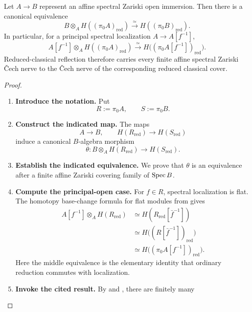 \begin{lemma}
\label{lem:reduced-zariski-base-change}
Let \(A\to B\) represent an affine spectral Zariski open immersion. Then there
is a canonical equivalence
\[
  B\otimes_AH((\pi_0A)_{\mathrm{red}})
  \xrightarrow{\simeq}
  H((\pi_0B)_{\mathrm{red}}).
\]
In particular, for a principal spectral localization \(A\to A[f^{-1}]\),
\[
  A[f^{-1}]
  \otimes_A
  H((\pi_0A)_{\mathrm{red}})
  \xrightarrow{\simeq}
  H\bigl((\pi_0A[f^{-1}])_{\mathrm{red}}\bigr).
\]
Reduced-classical reflection therefore carries every finite affine spectral
Zariski \v{C}ech nerve to the \v{C}ech nerve of the corresponding reduced
classical cover.
\end{lemma}

\begin{proof}
\leavevmode
\begin{enumerate}[label=\textup{(\arabic*)}]
    \item \textbf{Introduce the notation.}
    Put
    \[
    R:=\pi_0A,
    \qquad
    S:=\pi_0B.
    \]
    \item \textbf{Construct the indicated map.}
    The maps
    \[
    A\longrightarrow B,
    \qquad
    H(R_{\mathrm{red}})\longrightarrow H(S_{\mathrm{red}})
    \]
    induce a canonical \(B\)-algebra morphism
    \[
    \theta:
    B\otimes_AH(R_{\mathrm{red}})
    \longrightarrow
    H(S_{\mathrm{red}}).
    \]
    \item \textbf{Establish the indicated equivalence.}
    We prove that \(\theta\) is an equivalence after a finite affine Zariski
    covering family of \(\operatorname{Spec} B\).
    \item \textbf{Compute the principal-open case.}
    For \(f\in R\), spectral localization is flat. The homotopy base-change
    formula for flat modules from
     gives
    \[
    \begin{aligned}
    A[f^{-1}]\otimes_AH(R_{\mathrm{red}})
    &\simeq
    H(R_{\mathrm{red}}[\bar f^{-1}])\\
    &\simeq
    H\bigl((R[\bar f^{-1}])_{\mathrm{red}}\bigr)\\
    &\simeq
    H\bigl((\pi_0A[f^{-1}])_{\mathrm{red}}\bigr).
    \end{aligned}
    \]
    Here the middle equivalence is the elementary identity that ordinary
    reduction commutes with localization.
    \item \textbf{Invoke the cited result.}
    By  and
    , there are finitely many

\end{enumerate}
\end{proof}
